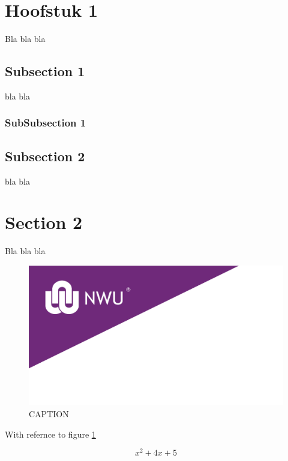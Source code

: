 \documentclass{article}
\begin{document}
\listoffigures

\listoftables

\pagebreak


\section{Hoofstuk 1}
Bla bla bla 
\subsection{Subsection 1}
bla bla
\subsubsection{SubSubsection 1}

\subsection{Subsection 2}
bla bla

\section{Section 2}
Bla bla bla \cite{CountdownTimer}


\begin{figure}[h]
\center
\includegraphics[scale=0.5]{NWU_Purple_Cover.png}
\textcolor{Puk_Pers}{\caption{CAPTION}}
\label{LABEL_NAME}
\end{figure}

With refernce to figure \ref{LABEL_NAME} 


\begin{equation} 
x^2 + 4x + 5 
\label{EQUATION NAME}
\end{equation}
\end{document}
